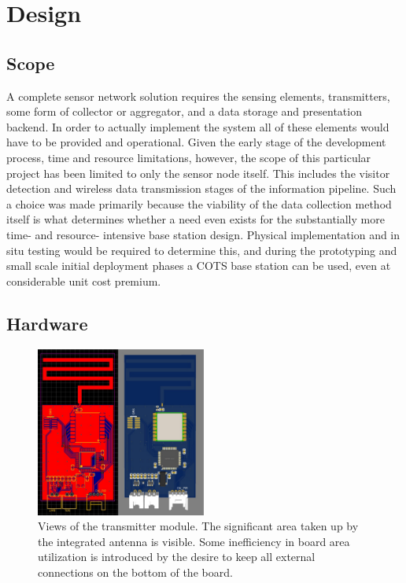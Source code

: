 \documentclass[10pt,nocopyrightspace]{ewsn-proc}
\begin{document}
\section{Design}

\subsection{Scope}
A complete sensor network solution requires the sensing elements, transmitters, some form of collector or aggregator, and a data storage and presentation backend. In order to actually implement the system all of these elements would have to be provided and operational. Given the early stage of the development process, time and resource limitations, however, the scope of this particular project has been limited to only the sensor node itself. This includes the visitor detection and wireless data transmission stages of the information pipeline. Such a choice was made primarily because the viability of the data collection method itself is what determines whether a need even exists for the substantially more time- and resource- intensive base station design. Physical implementation and in situ testing would be required to determine this, and during the prototyping and small scale initial deployment phases a COTS base station can be used, even at considerable unit cost premium.


\subsection{Hardware}

\begin{figure}[t!]
\centering
\includegraphics[height=2.2in]{./Images/transmitter}
\caption{Views of the transmitter module. The significant area taken up by the integrated antenna is visible. Some inefficiency in board area utilization is introduced by the desire to keep all external connections on the bottom of the board.}
\end{figure}
\end{document}
